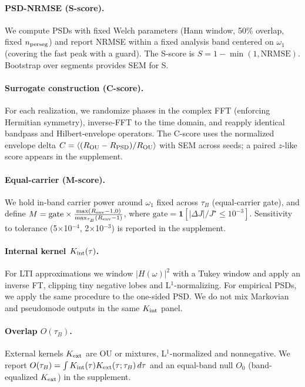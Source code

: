 \documentclass[11pt,letterpaper]{article}
\begin{document}
\paragraph*{PSD-NRMSE (S-score).} We compute PSDs with fixed Welch parameters (Hann window, 50\% overlap, fixed $n_{\rm perseg}$) and report NRMSE within a fixed analysis band centered on $\omega_1$ (covering the fast peak with a guard). The S-score is $S=1-\min(1,\mathrm{NRMSE})$. Bootstrap over segments provides SEM for S.

\paragraph*{Surrogate construction (C-score).} For each realization, we randomize phases in the complex FFT (enforcing Hermitian symmetry), inverse-FFT to the time domain, and reapply identical bandpass and Hilbert-envelope operators. The C-score uses the normalized envelope delta $C=\langle (R_{\rm OU}-R_{\rm PSD})/R_{\rm OU}\rangle$ with SEM across seeds; a paired $z$-like score appears in the supplement.

\paragraph*{Equal-carrier (M-score).} We hold in-band carrier power around $\omega_1$ fixed across $\tau_B$ (equal-carrier gate), and define $M=\mathrm{gate}\times \frac{\max(R_{\rm env}-1,0)}{\max_{\tau_B}(R_{\rm env}-1)}$, where $\mathrm{gate}=\mathbf{1}[|\Delta J|/J^\star\le 10^{-3}]$. Sensitivity to tolerance (5$\times$10$^{-4}$, 2$\times$10$^{-3}$) is reported in the supplement.

\paragraph*{Internal kernel $K_{\rm int}(\tau)$.} For LTI approximations we window $|H(\omega)|^2$ with a Tukey window and apply an inverse FT, clipping tiny negative lobes and L$^1$-normalizing. For empirical PSDs, we apply the same procedure to the one-sided PSD. We do not mix Markovian and pseudomode outputs in the same $K_{\rm int}$ panel.

\paragraph*{Overlap $O(\tau_B)$.} External kernels $K_{\rm ext}$ are OU or mixtures, L$^1$-normalized and nonnegative. We report $O(\tau_B)=\int K_{\rm int}(\tau)K_{\rm ext}(\tau;\tau_B)\,d\tau$ and an equal-band null $O_0$ (band-equalized $K_{\rm ext}$) in the supplement.
\end{document}
